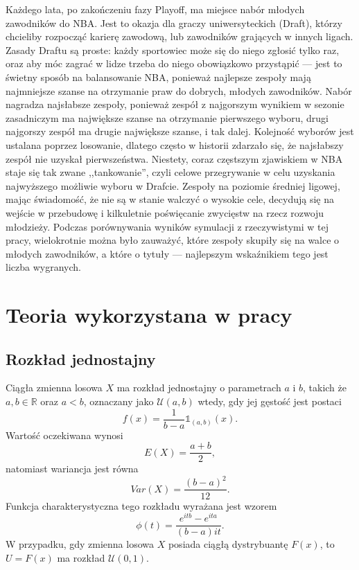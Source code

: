 \documentclass[inzynierska]{pwr_wmat_praca_dyplomowa}
\theoremstyle{plain}
\numberwithin{theorem}{chapter}
\theoremstyle{definition}
\numberwithin{theorem}{chapter}
\begin{document}
Każdego lata, po zakończeniu fazy Playoff, ma miejsce nabór młodych zawodników do NBA. Jest to okazja dla graczy uniwersyteckich (Draft), którzy chcieliby rozpocząć karierę zawodową, lub zawodników grających w innych ligach. Zasady Draftu są proste: każdy sportowiec może się do niego zgłosić tylko raz, oraz aby móc zagrać w lidze trzeba do niego obowiązkowo przystąpić --- jest to świetny sposób na balansowanie NBA, ponieważ najlepsze zespoły mają najmniejsze szanse na otrzymanie praw do dobrych, młodych zawodników. Nabór nagradza najsłabsze zespoły, ponieważ zespół z najgorszym wynikiem w sezonie zasadniczym ma największe szanse na otrzymanie pierwszego wyboru, drugi najgorszy zespół ma drugie największe szanse, i tak dalej. Kolejność wyborów jest ustalana poprzez losowanie, dlatego często w historii zdarzało się, że najsłabszy zespół nie uzyskał pierwszeństwa. Niestety, coraz częstszym zjawiskiem w NBA staje się tak zwane ,,tankowanie'', czyli celowe przegrywanie w celu uzyskania najwyższego możliwie wyboru w Drafcie. Zespoły na poziomie średniej ligowej, mając świadomość, że nie są w stanie walczyć o wysokie cele, decydują się na wejście w przebudowę i kilkuletnie poświęcanie zwycięstw na rzecz rozwoju młodzieży. Podczas porównywania wyników symulacji z rzeczywistymi w tej pracy, wielokrotnie można było zauważyć, które zespoły skupiły się na walce o młodych zawodników, a które o tytuły --- najlepszym wskaźnikiem tego jest liczba wygranych.

\chapter{Teoria wykorzystana w pracy}

\section{Rozkład jednostajny}
Ciągła zmienna losowa $X$ ma rozkład jednostajny o parametrach $a$ i $b$, takich że $a,b\in \mathds{R}$ oraz $a<b$, oznaczany jako $\mathcal{U}(a,b)$ wtedy, gdy jej gęstość jest postaci
\begin{equation}
f(x)=\frac{1}{b-a}\mathds{1}_{(a,b)}(x).
\end{equation}
Wartość oczekiwana wynosi
\begin{equation}
E(X)=\frac{a+b}{2},
\end{equation}
natomiast wariancja jest równa
\begin{equation}
Var(X)=\frac{(b-a)^2}{12}.
\end{equation} 
Funkcja charakterystyczna tego rozkładu wyrażana jest wzorem
\begin{equation}
\phi(t)=\frac{e^{itb}-e^{ita}}{(b-a)it}.
\end{equation}
W przypadku, gdy zmienna losowa $X$ posiada ciągłą dystrybuantę $F(x)$, to $U=F(x)$ ma rozkład $\mathcal{U}(0,1).$
\end{document}
